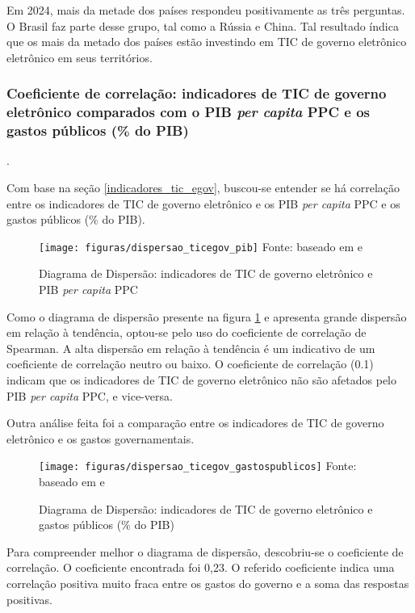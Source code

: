 Em 2024, mais da metade dos países respondeu positivamente as três perguntas. O Brasil faz parte desse grupo, tal como a Rússia e China. Tal resultado índica que os mais da metado dos países estão investindo em TIC de governo eletrônico eletrônico em seus territórios.

\subsubsection{Coeficiente de correlação: indicadores de TIC de governo eletrônico  comparados com o PIB \textit{per capita} PPC e os gastos públicos (\% do PIB)}.

Com base na seção \ref{indicadores_tic_egov}, buscou-se entender se há correlação entre os indicadores de TIC de governo eletrônico e os PIB \textit{per capita} PPC e os gastos públicos (\% do PIB).

\begin{figure}[H]
	\centering
	\caption{Diagrama de Dispersão: indicadores de TIC de governo eletrônico e PIB \textit{per capita} PPC}
	\texttt{[image: figuras/dispersao\_ticegov\_pib]}
	\label{fig:dispersao_ticegov_pib}
	\footnotesize{Fonte: baseado em \cite{WB_pib_per_capita_países} e \cite{ONU_ICT_in_government_indicators}}
\end{figure}

Como o diagrama de dispersão presente na figura \ref{fig:dispersao_ticegov_pib} e apresenta grande dispersão em relação à tendência, optou-se pelo uso do coeficiente de correlação de Spearman. A alta dispersão em relação à tendência é um indicativo de um coeficiente de correlação neutro ou baixo. O coeficiente de correlação (0.1) indicam que os indicadores de TIC de governo eletrônico não são afetados pelo PIB \textit{per capita} PPC, e vice-versa.

Outra análise feita foi a comparação entre os indicadores de TIC de governo eletrônico e os gastos governamentais.

\begin{figure}[H]
	\centering
	\caption{Diagrama de Dispersão: indicadores de TIC de governo eletrônico e gastos públicos (\% do PIB)}
	\texttt{[image: figuras/dispersao\_ticegov\_gastospublicos]}
	\label{fig:dispersao_ticegov_gastospublicos}
	\footnotesize{Fonte: baseado em \cite{FMI_gov_expenditure} e \cite{ONU_ICT_in_government_indicators}}
\end{figure}

Para compreender melhor o diagrama de dispersão, descobriu-se o coeficiente de correlação. O coeficiente encontrada foi 0,23. O referido coeficiente indica uma correlação positiva muito fraca entre os gastos do governo e a soma das respostas positivas. 